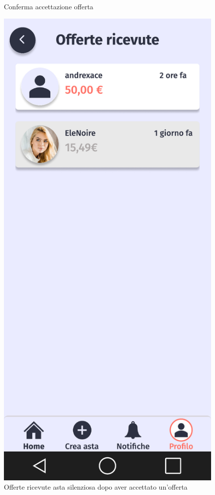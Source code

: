\begin{figure}[!htb]
\begin{minipage}{0.32\textwidth}
                \caption{Conferma accettazione offerta}
            \end{minipage}\hfill
            \begin{minipage}{0.32\textwidth}
                \centering
                \includegraphics[width=.7\linewidth]{Immagini/Frames/Venditore/V14.pdf}
                \caption{Offerte ricevute asta silenziosa dopo aver accettato un'offerta}
            \end{minipage}\hfill
        \end{figure}
    
